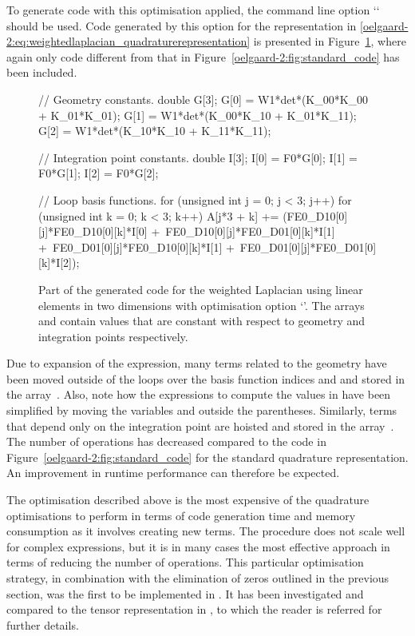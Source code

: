 To generate code with this optimisation applied,
the \ffc{} command line option `` should be used.
Code generated by this option for the representation in
\eqref{oelgaard-2:eq:weightedlaplacian_quadraturerepresentation} is presented in
Figure~\ref{oelgaard-2:fig:O_simplify_code}, where again only code different
from that in Figure~\ref{oelgaard-2:fig:standard_code} has been included.
%
\begin{figure}
\begin{code}
// Geometry constants.
double G[3];
G[0] = W1*det*(K_00*K_00 + K_01*K_01);
G[1] = W1*det*(K_00*K_10 + K_01*K_11);
G[2] = W1*det*(K_10*K_10 + K_11*K_11);

// Integration point constants.
double I[3];
I[0] = F0*G[0];
I[1] = F0*G[1];
I[2] = F0*G[2];

// Loop basis functions.
for (unsigned int j = 0; j < 3; j++)
{
 for (unsigned int k = 0; k < 3; k++)
 {
  A[j*3 + k] += (FE0_D10[0][j]*FE0_D10[0][k]*I[0] +\
                 FE0_D10[0][j]*FE0_D01[0][k]*I[1] +\
                 FE0_D01[0][j]*FE0_D10[0][k]*I[1] +\
                 FE0_D01[0][j]*FE0_D01[0][k]*I[2]);
 }
}
\end{code}
\caption{Part of the generated code for the weighted Laplacian using linear
         elements in two dimensions with optimisation option
         `'.
         The arrays \emp{G} and \emp{I} contain values that are constant with
         respect to geometry and integration points respectively.}
\label{oelgaard-2:fig:O_simplify_code}
\end{figure}
%
Due to expansion of the expression, many terms related to the geometry have been
moved outside of the loops over the basis function indices  and  and
stored in the array~.
Also, note how the expressions to compute the values in \emp{G} have been
simplified by moving the variables \emp{det} and \emp{W1} outside the
parentheses.
Similarly, terms that depend only on the integration point are hoisted and
stored in the array~\emp{I}.
The number of operations has decreased compared to the
code in Figure~\ref{oelgaard-2:fig:standard_code} for the standard quadrature
representation. An improvement in runtime performance can therefore be
expected.

The optimisation described above is the most expensive of the quadrature
optimisations to perform in terms of \ffc{} code generation time
and memory consumption as it involves creating new terms.
The procedure does not scale well for complex expressions, but it is in many
cases the most effective approach in terms of reducing the number of operations.
This particular optimisation strategy, in combination with the
elimination of zeros outlined in the previous section, was the first to be
implemented in \ffc{}.
It has been investigated and compared to the tensor representation in
\citet{OlgaardWells2010}, to which the reader is referred for further details.
%

